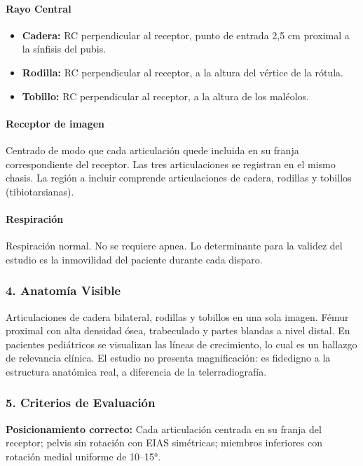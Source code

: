 	\paragraph{Rayo Central}
	\begin{itemize}
		\item \textbf{Cadera:} RC perpendicular al receptor, punto de entrada 2,5 cm proximal a la sínfisis del pubis.
		\item \textbf{Rodilla:} RC perpendicular al receptor, a la altura del vértice de la rótula.
		\item \textbf{Tobillo:} RC perpendicular al receptor, a la altura de los maléolos.
	\end{itemize}
	
	\paragraph{Receptor de imagen}
	Centrado de modo que cada articulación quede incluida en su franja correspondiente del receptor. Las tres articulaciones se registran en el mismo chasis. La región a incluir comprende articulaciones de cadera, rodillas y tobillos (tibiotarsianas).
	
	\paragraph{Respiración}
	Respiración normal. No se requiere apnea. Lo determinante para la validez del estudio es la inmovilidad del paciente durante cada disparo.
	
	\subsubsection*{4. Anatomía Visible}
	
	Articulaciones de cadera bilateral, rodillas y tobillos en una sola imagen. Fémur proximal con alta densidad ósea, trabeculado y partes blandas a nivel distal. En pacientes pediátricos se visualizan las líneas de crecimiento, lo cual es un hallazgo de relevancia clínica. El estudio no presenta magnificación: es fidedigno a la estructura anatómica real, a diferencia de la telerradiografía.
	
	\subsubsection*{5. Criterios de Evaluación}
	
	\textbf{Posicionamiento correcto:} Cada articulación centrada en su franja del receptor; pelvis sin rotación con EIAS simétricas; miembros inferiores con rotación medial uniforme de 10--15°.
	
